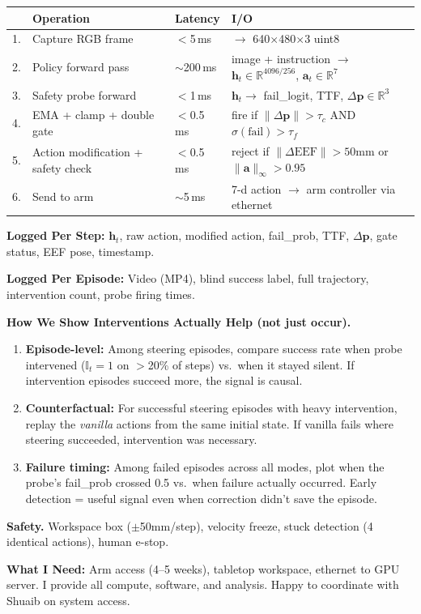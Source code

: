 \documentclass[10pt]{article}
\begin{document}
\vspace{-2pt}
{\small
\begin{tabular}{@{}rp{4.5cm}p{2cm}p{6.5cm}@{}}
& \textbf{Operation} & \textbf{Latency} & \textbf{I/O} \\
\midrule
1. & Capture RGB frame & $<$5\,ms & $\to$ 640$\times$480$\times$3 uint8 \\
2. & Policy forward pass & $\sim$200\,ms & image + instruction $\to$ $\mathbf{h}_t \in \mathbb{R}^{4096/256}$, $\mathbf{a}_t \in \mathbb{R}^{7}$ \\
3. & Safety probe forward & $<$1\,ms & $\mathbf{h}_t \to$ fail\_logit, TTF, $\Delta\mathbf{p} \in \mathbb{R}^3$ \\
4. & EMA + clamp + double gate & $<$0.5\,ms & fire if $\|\Delta\mathbf{p}\| > \tau_c$ AND $\sigma(\text{fail}) > \tau_f$ \\
5. & Action modification + safety check & $<$0.5\,ms & reject if $\|\Delta\text{EEF}\| > 50$mm or $\|\mathbf{a}\|_\infty > 0.95$ \\
6. & Send to arm & $\sim$5\,ms & 7-d action $\to$ arm controller via ethernet \\
\bottomrule
\end{tabular}
}

\vspace{4pt}
\textbf{Logged Per Step:} $\mathbf{h}_t$, raw action, modified action, fail\_prob, TTF, $\Delta\mathbf{p}$, gate status, EEF pose, timestamp.

\textbf{Logged Per Episode:} Video (MP4), blind success label, full trajectory, intervention count, probe firing times.

\vspace{2pt}
\textbf{How We Show Interventions Actually Help (not just occur).}
\begin{enumerate}[leftmargin=1.2em, topsep=2pt, itemsep=1pt]
\item \textbf{Episode-level:} Among steering episodes, compare success rate when probe intervened ($\mathbb{I}_t{=}1$ on $>$20\% of steps) vs.\ when it stayed silent. If intervention episodes succeed more, the signal is causal.
\item \textbf{Counterfactual:} For successful steering episodes with heavy intervention, replay the \emph{vanilla} actions from the same initial state. If vanilla fails where steering succeeded, intervention was necessary.
\item \textbf{Failure timing:} Among failed episodes across all modes, plot when the probe's fail\_prob crossed 0.5 vs.\ when failure actually occurred. Early detection = useful signal even when correction didn't save the episode.
\end{enumerate}

\vspace{2pt}
\textbf{Safety.} Workspace box ($\pm$50mm/step), velocity freeze, stuck detection (4 identical actions), human e-stop.

\textbf{What I Need:} Arm access (4--5 weeks), tabletop workspace, ethernet to GPU server. I provide all compute, software, and analysis. Happy to coordinate with Shuaib on system access.
\end{document}

